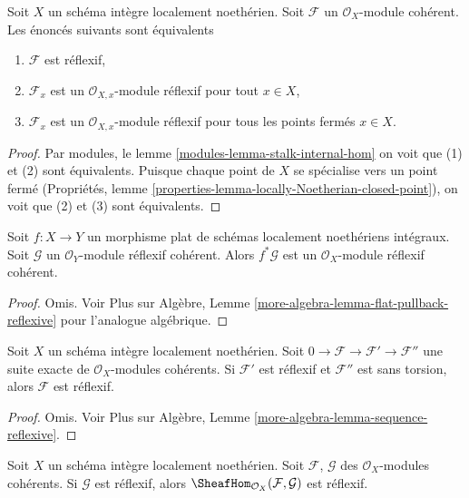 \begin{lemma}
\label{lemma-check-reflexive}
Soit  $X$  un schéma intègre localement noethérien. Soit  $\mathcal{F}$  un
 $\mathcal{O}_X$-module cohérent. Les énoncés suivants sont équivalents
\begin{enumerate}
\item $\mathcal{F}$  est réflexif,
\item $\mathcal{F}_x$  est un  $\mathcal{O}_{X, x}$-module réflexif pour tout  $x \in X$,
\item $\mathcal{F}_x$  est un  $\mathcal{O}_{X, x}$-module réflexif pour tous les points fermés
 $x \in X$.
\end{enumerate}
\end{lemma}

\begin{proof}
Par modules, le lemme  \ref{modules-lemma-stalk-internal-hom}  on voit que (1) et (2) sont équivalents.
Puisque chaque point de  $X$  se spécialise vers un point fermé
(Propriétés, lemme  \ref{properties-lemma-locally-Noetherian-closed-point}), on voit que (2) et (3) sont équivalents.
\end{proof}

\begin{lemma}
\label{lemma-flat-pullback-reflexive}
Soit  $f : X \to Y$  un morphisme plat de schémas localement noethériens intégraux.
Soit  $\mathcal{G}$  un  $\mathcal{O}_Y$-module réflexif cohérent. Alors  $f^*\mathcal{G}$  est
un  $\mathcal{O}_X$-module réflexif cohérent.
\end{lemma}

\begin{proof}
Omis. Voir Plus sur Algèbre, Lemme  \ref{more-algebra-lemma-flat-pullback-reflexive}  pour l'analogue algébrique.
\end{proof}

\begin{lemma}
\label{lemma-sequence-reflexive}
Soit  $X$  un schéma intègre localement noethérien. Soit  $0 \to \mathcal{F} \to \mathcal{F}' \to \mathcal{F}''$  une
suite exacte de  $\mathcal{O}_X$-modules cohérents. Si  $\mathcal{F}'$  est réflexif et
 $\mathcal{F}''$  est sans torsion, alors  $\mathcal{F}$  est réflexif.
\end{lemma}

\begin{proof}
Omis. Voir Plus sur Algèbre, Lemme  \ref{more-algebra-lemma-sequence-reflexive}.
\end{proof}

\begin{lemma}
\label{lemma-dual-reflexive}
Soit  $X$  un schéma intègre localement noethérien. Soit  $\mathcal{F}$,
 $\mathcal{G}$  des  $\mathcal{O}_X$-modules cohérents. Si  $\mathcal{G}$  est réflexif,
alors  $\SheafHom_{\mathcal{O}_X}(\mathcal{F}, \mathcal{G})$  est réflexif.
\end{lemma}

